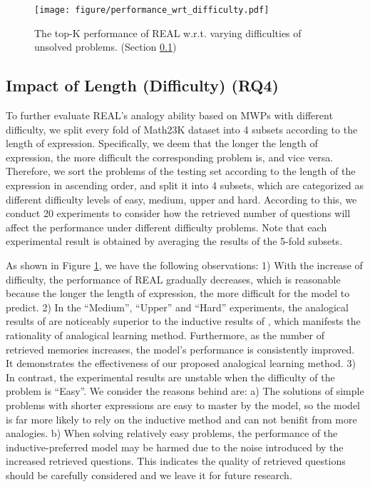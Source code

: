 \documentclass[11pt, a4paper]{article}
\begin{document}
\begin{figure}[t]
  \centering
  \texttt{[image: figure/performance\_wrt\_difficulty.pdf]}
  \vspace{-0.5cm}
  \caption{The top-K performance of REAL w.r.t. varying difficulties of unsolved problems. (Section \ref{section: RQ4})}
  \label{fig: diff}
\end{figure}

\subsection{Impact of Length (Difficulty) (RQ4)} \label{section: RQ4}
To further evaluate REAL's analogy ability based on MWPs with different difficulty, we split every fold of Math23K dataset into 4 subsets according to the length of expression. Specifically, we deem that the longer the length of expression, the more difficult the corresponding problem is, and vice versa. Therefore, we sort the problems of the testing set according to the length of the expression in ascending order, and split it into 4 subsets, which are categorized as different difficulty levels of easy, medium, upper and hard. According to this, we conduct 20 experiments to consider how the retrieved number of questions will affect the performance under different difficulty problems. Note that each experimental result is obtained by averaging the results of the 5-fold subsets. 

As shown in Figure \ref{fig: diff}, we have the following observations: 
1) With the increase of difficulty, the performance of REAL gradually decreases, which is reasonable because the longer the length of expression, the more difficult for the model to predict. 
2) In the ``Medium'', ``Upper'' and ``Hard'' experiments, the analogical results of  are noticeably superior to the inductive results of , which manifests the rationality of analogical learning method. Furthermore, as the number of retrieved memories increases, the model's performance is consistently improved. It demonstrates the effectiveness of our proposed analogical learning method. 
3) In contrast, the experimental results are unstable when the difficulty of the problem is ``Easy''. We consider the reasons behind are: a) The solutions of simple problems with shorter expressions are easy to master by the model, so the model is far more likely to rely on the inductive method and can not benifit from more analogies. b) When solving relatively easy problems, the performance of the inductive-preferred model may be harmed due to the noise introduced by the increased retrieved questions. 
This indicates the quality of retrieved questions should be carefully considered and we leave it for future research.
\end{document}
